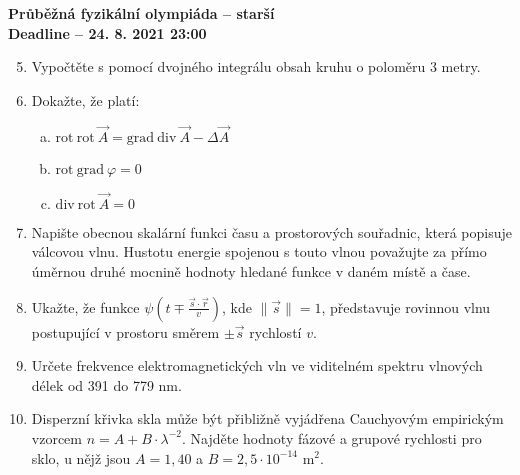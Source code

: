 \documentclass[a4paper, 12pt]{article}
\newcommand{\grad}{\mathrm{grad}~}
\newcommand{\dive}{\mathrm{div}~}
\newcommand{\rot}{\mathrm{rot}~}
\begin{document}
\begin{center}
\textbf{{\large
Průběžná fyzikální olympiáda -- starší\\
Deadline -- 24. 8. 2021 23:00
}}

\end{center}


\begin{enumerate} [1)]
\setcounter{enumi}{4}
\item\relax[5 bodů] Vypočtěte s pomocí dvojného integrálu obsah kruhu o poloměru 3 metry. 
\item\relax[6 bodů] Dokažte, že platí:

\begin{enumerate}[a)]
    \item $\rot\rot\vec{A}=\grad\dive\vec{A} - \Delta\vec{A}$
    \item $\rot\grad \varphi = 0$
    \item $\dive\rot\vec{A}= 0$
\end{enumerate}
\item\relax[10 bodů]
Napište obecnou skalární funkci času a prostorových souřadnic, která popisuje válcovou vlnu. Hustotu energie spojenou s touto vlnou považujte za přímo úměrnou druhé mocnině hodnoty hledané funkce v daném místě a čase.
\item\relax[5 bodů] Ukažte, že funkce $\psi(t\mp\frac{\vec{s}\cdot \vec{r}}{v})$, kde $\|\vec{s}\|=1$, představuje rovinnou vlnu postupující v prostoru směrem $\pm\vec{s}$ rychlostí $v$.

\item\relax[2 body] Určete frekvence elektromagnetických vln ve viditelném spektru vlnových délek od 391 do 779 nm.
\item\relax[3 body] Disperzní křivka skla může být přibližně vyjádřena Cauchyovým empirickým vzorcem $n=A + B\cdot \lambda^{-2}$. Najděte hodnoty fázové a grupové rychlosti pro sklo, u nějž jsou $A=1,40$ a $B=2,5\cdot10^{-14}$ m$^2$. 
\end{enumerate}
\end{document}
